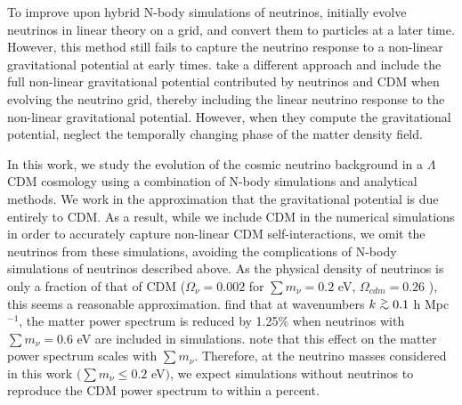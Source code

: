 \documentclass[twocolumn,superscriptaddress,prd]{revtex4}
\def\gtsima{$\; \buildrel > \over \sim \;$}
\def\gsim{\lower.5ex\hbox{\gtsima}}
\begin{document}
To improve upon hybrid N-body simulations of neutrinos,
\cite{brandbyge09}
initially evolve neutrinos
in linear theory on a grid, and convert them to
particles at a later time.  However, this method still fails to
capture the neutrino response to a non-linear gravitational potential
at early times. \cite{yacine12} take a different approach and include
the full non-linear gravitational potential contributed by 
neutrinos and CDM when evolving the neutrino grid, 
thereby including the linear neutrino response to the
non-linear gravitational potential.  
However, when they compute the gravitational
potential, \cite{yacine12} neglect the temporally changing phase of the
matter density field.

In this work, we study the evolution of the cosmic neutrino
background in a $\Lambda$CDM
cosmology using a combination of N-body simulations and
analytical methods.  We work in the approximation that the
gravitational potential is due entirely to CDM.  As a
result, while we include CDM in the numerical
simulations in order to accurately capture non-linear 
CDM self-interactions, we omit
the neutrinos from these simulations, avoiding the complications of
N-body simulations of neutrinos described above.  
As the physical
density of neutrinos is only a fraction of that of CDM
($\Omega_\nu = 0.002$ for $\sum m_\nu = 0.2$ eV, $\Omega_{cdm} = 0.26$
\citep{planck15}), this seems a reasonable approximation. 
\cite{brandbyge08,brandbyge09} find that at wavenumbers $k\gsim 0.1$ h
Mpc$^{-1}$, the matter power spectrum is reduced by
1.25\% when neutrinos with $\sum m_\nu =0.6$ eV are included in simulations.
\cite{brandbyge09} 
note that
this effect on the matter power spectrum scales with
$\sum m_\nu$.  Therefore, at the neutrino masses considered in this
work $\big(\sum m_\nu \leq 0.2$ eV$\big)$, we expect simulations without
neutrinos to reproduce the CDM power spectrum to within
a percent.
\end{document}

